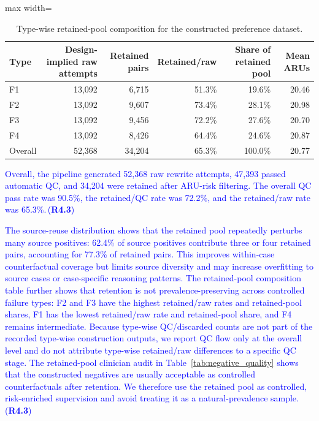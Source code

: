 \documentclass[a4paper,fleqn,doubleblind]{cas-sc}
\DeclareRobustCommand{\added}[1]{\textcolor{blue}{#1}}
\DeclareRobustCommand{\revtag}[1]{\textcolor{blue}{\scriptsize\,(\textbf{#1})}}
\begin{document}
\begin{table}[htbp]
    \centering
    \begingroup\color{blue}
    \footnotesize
    \caption{Type-wise retained-pool composition for the constructed preference dataset.}
    \label{tab:dataset_bias_retention}
    \begin{adjustbox}{max width=\textwidth}
    \begin{tabular}{lrrrrr}
        \toprule
        \textbf{Type} & \textbf{Design-implied raw attempts} & \textbf{Retained pairs} & \textbf{Retained/raw} & \textbf{Share of retained pool} & \textbf{Mean ARUs} \\
        \midrule
        F1 & 13,092 & 6,715 & 51.3\% & 19.6\% & 20.46 \\
        F2 & 13,092 & 9,607 & 73.4\% & 28.1\% & 20.98 \\
        F3 & 13,092 & 9,456 & 72.2\% & 27.6\% & 20.70 \\
        F4 & 13,092 & 8,426 & 64.4\% & 24.6\% & 20.87 \\
        \midrule
        Overall & 52,368 & 34,204 & 65.3\% & 100.0\% & 20.77 \\
        \bottomrule
    \end{tabular}
    \end{adjustbox}
    \endgroup
\end{table}

\added{Overall, the pipeline generated 52,368 raw rewrite attempts, 47,393 passed automatic QC, and 34,204 were retained after ARU-risk filtering. The overall QC pass rate was 90.5\%, the retained/QC rate was 72.2\%, and the retained/raw rate was 65.3\%.}\revtag{R4.3}

\added{The source-reuse distribution shows that the retained pool repeatedly perturbs many source positives: 62.4\% of source positives contribute three or four retained pairs, accounting for 77.3\% of retained pairs. This improves within-case counterfactual coverage but limits source diversity and may increase overfitting to source cases or case-specific reasoning patterns. The retained-pool composition table further shows that retention is not prevalence-preserving across controlled failure types: F2 and F3 have the highest retained/raw rates and retained-pool shares, F1 has the lowest retained/raw rate and retained-pool share, and F4 remains intermediate. Because type-wise QC/discarded counts are not part of the recorded type-wise construction outputs, we report QC flow only at the overall level and do not attribute type-wise retained/raw differences to a specific QC stage. The retained-pool clinician audit in Table~\ref{tab:negative_quality} shows that the constructed negatives are usually acceptable as controlled counterfactuals after retention. We therefore use the retained pool as controlled, risk-enriched supervision and avoid treating it as a natural-prevalence sample.}\revtag{R4.3}
\end{document}
